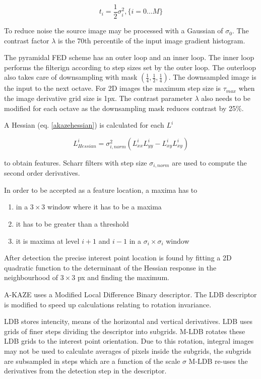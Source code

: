 \documentclass[english,12pt,a4paper,pdftex,elec,utf8]{aaltothesis}
\begin{document}
\begin{equation}
  \label{scaletotime}
t_i = \frac{1}{2}\sigma^2_i,\{i=0\ldots M\}
\end{equation}

To reduce noise the source image may be processed with a Gaussian of $\sigma_0$. The contrast factor $\lambda$ is the 70th percentile of the input image gradient histogram.

The pyramidal FED scheme has an outer loop and an inner loop. The inner loop performs the filterign according to step sizes set by the outer loop. The outerloop also takes care of downsampling with mask $(\frac{1}{4}, \frac{1}{2}, \frac{1}{4})$. The downsampled image is the input to the next octave. For 2D images the maximum step size is $\tau_{max}$ when the image derivative grid size is 1px. The contrast parameter $\lambda$ also needs to be modified for each octave as the downsampling mask reduces contrast by 25\%.

A Hessian (eq. \ref{akazehessian}) is calculated for each $L^i$

\begin{equation}
  \label{akazehessian}
L^i_{Hessian} = \sigma^2_{i,norm}(L^i_{xx}L^i_{yy}-L^i_{xy}L^i_{xy})
\end{equation}

to obtain features. Scharr filters with step size $\sigma_{i,norm}$ are used to compute the second order derivatives.

In order to be accepted as a feature location, a maxima has to

\begin{enumerate}
\item in a $3 \times 3$ window where it has to be a maxima
\item it has to be greater than a threshold
\item it is maxima at level $i+1$ and $i-1$ in a $\sigma_i\times\sigma_i$ window
\end{enumerate}

After detection the precise interest point location is found by fitting a 2D quadratic function to the determinant of the Hessian response in the neighbourhood of $3 \times 3$ px and finding the maximum.

A-KAZE uses a Modified Local Difference Binary descriptor. The LDB descriptor is modified to speed up calculations relating to rotation invariance.

LDB stores intencity, means of the horizontal and vertical derivatives. LDB uses grids of finer steps dividing the descriptor into subgrids. M-LDB rotates these LDB grids to the interest point orientation. Due to this rotation, integral images may not be used to calculate averages of pixels inside the subgrids, the subgrids are subsampled in steps which are a function of the scale $\sigma$ M-LDB re-uses the derivatives from the detection step in the descriptor.
\end{document}
